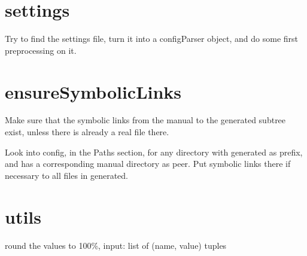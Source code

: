 \documentclass[a4paper,10pt,english]{sphinxmanual}
\begin{document}
\section{settings}
\label{sourcecodedoc:module-settings}\label{sourcecodedoc:settings}

\begin{fulllineitems}
\label{sourcecodedoc:settings.getSettings}
Try to find the settings file, turn it into a configParser
object, and do some first preprocessing on it.

\end{fulllineitems}



\section{ensureSymbolicLinks}
\label{sourcecodedoc:ensuresymboliclinks}\label{sourcecodedoc:module-ensureSymbolicLinks}
Make sure that the symbolic links from the manual to the generated
subtree exist, unless there is already a real file there.

\begin{fulllineitems}
\label{sourcecodedoc:ensureSymbolicLinks.createLinks}
Look into config, in the Paths section, for any directory
with generated as prefix, and has a corresponding manual directory as peer.
Put symbolic links there if necessary to all files in generated.

\end{fulllineitems}



\section{utils}
\label{sourcecodedoc:utils}\label{sourcecodedoc:module-utils}

\begin{fulllineitems}
\label{sourcecodedoc:utils.roundPie}
round the values to 100\%, input: list of (name, value) tuples

\end{fulllineitems}
\end{document}
